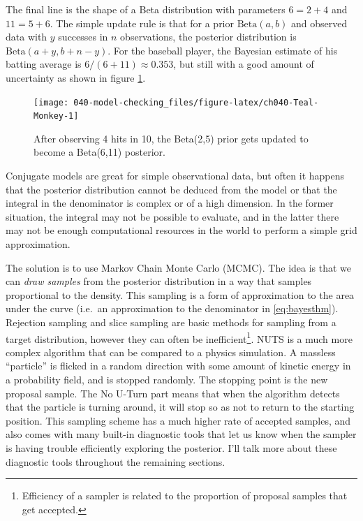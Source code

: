 \documentclass[11pt, oneside, openany]{scrbook}
\begin{document}
The final line is the shape of a Beta distribution with parameters \(6=2+4\) and \(11=5+6\). The simple update rule is that for a prior \(\mathrm{Beta}(a, b)\) and observed data with \(y\) successes in \(n\) observations, the posterior distribution is \(\mathrm{Beta}(a + y, b + n - y)\). For the baseball player, the Bayesian estimate of his batting average is \(6/(6+11) \approx 0.353\), but still with a good amount of uncertainty as shown in figure \ref{fig:ch040-Teal-Monkey}.

\begin{figure}

{\centering \texttt{[image: 040-model-checking\_files/figure-latex/ch040-Teal-Monkey-1]} 

}

\caption{After observing 4 hits in 10, the Beta(2,5) prior gets updated to become a Beta(6,11) posterior.}\label{fig:ch040-Teal-Monkey}
\end{figure}

Conjugate models are great for simple observational data, but often it happens that the posterior distribution cannot be deduced from the model or that the integral in the denominator is complex or of a high dimension. In the former situation, the integral may not be possible to evaluate, and in the latter there may not be enough computational resources in the world to perform a simple grid approximation.

The solution is to use Markov Chain Monte Carlo (MCMC). The idea is that we can \emph{draw samples} from the posterior distribution in a way that samples proportional to the density. This sampling is a form of approximation to the area under the curve (i.e.~an approximation to the denominator in \eqref{eq:bayesthm}). Rejection sampling \citep{gilks1992adaptive} and slice sampling \citep{neal2003slice} are basic methods for sampling from a target distribution, however they can often be inefficient\footnote{Efficiency of a sampler is related to the proportion of proposal samples that get accepted.}. NUTS is a much more complex algorithm that can be compared to a physics simulation. A massless ``particle'' is flicked in a random direction with some amount of kinetic energy in a probability field, and is stopped randomly. The stopping point is the new proposal sample. The No U-Turn part means that when the algorithm detects that the particle is turning around, it will stop so as not to return to the starting position. This sampling scheme has a much higher rate of accepted samples, and also comes with many built-in diagnostic tools that let us know when the sampler is having trouble efficiently exploring the posterior. I'll talk more about these diagnostic tools throughout the remaining sections.
\end{document}
